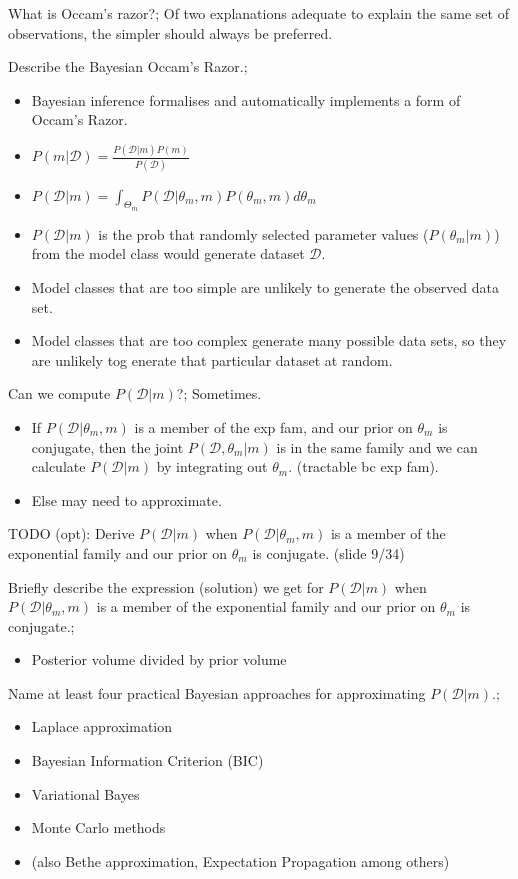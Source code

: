 \documentclass{article}
\begin{document}
What is Occam's razor?; Of two explanations adequate to explain the same set of observations, the simpler should always be preferred.

Describe the Bayesian Occam's Razor.; \begin{itemize} \item Bayesian inference formalises and automatically implements a form of Occam's Razor.  \item $P(m|\mathcal{D})=\frac{P(\mathcal{D}|m)P(m)}{P(\mathcal{D})}$ \item $P(\mathcal{D}|m)=\int_{\Theta_m}P(\mathcal{D}|\theta_m, m)P(\theta_m, m)d\theta_m$ \item $P(\mathcal{D}|m)$ is the prob that randomly selected parameter values ($P(\theta_m|m)$) from the model class would generate dataset $\mathcal{D}$.  \item Model classes that are too simple are unlikely to generate the observed data set.  \item Model classes that are too complex generate many possible data sets, so they are unlikely tog enerate that particular dataset at random.  \end{itemize}

Can we compute $P(\mathcal{D}|m)$?; Sometimes. \begin{itemize} \item If $P(\mathcal{D}|\theta_m, m)$ is a member of the exp fam, and our prior on $\theta_m$ is conjugate, then the joint $P(\mathcal{D},\theta_m|m)$ is in the same family and we can calculate $P(\mathcal{D}|m)$ by integrating out $\theta_m$. (tractable bc exp fam).  \item Else may need to approximate.  \end{itemize} 

TODO (opt): Derive $P(\mathcal{D}|m)$ when $P(\mathcal{D}|\theta_m, m)$ is a member of the exponential family and our prior on $\theta_m$ is conjugate. (slide 9/34)

Briefly describe the expression (solution) we get for $P(\mathcal{D}|m)$ when $P(\mathcal{D}|\theta_m, m)$ is a member of the exponential family and our prior on $\theta_m$ is conjugate.; \begin{itemize} \item Posterior volume divided by prior volume \end{itemize}

Name at least four practical Bayesian approaches for approximating $P(\mathcal{D}|m)$.; \begin{itemize} \item Laplace approximation \item Bayesian Information Criterion (BIC) \item Variational Bayes \item Monte Carlo methods \item (also Bethe approximation, Expectation Propagation among others) \end{itemize}
\end{document}

